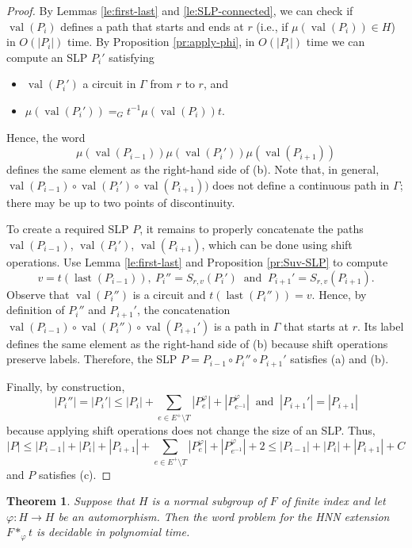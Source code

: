 \documentclass[12pt,oneside]{amsart}
\newtheorem{theorem}{Theorem}[section]
\theoremstyle{definition}
\theoremstyle{case}
\DeclareMathOperator{\last}{{last}}
\DeclareMathOperator{\val}{val}
\begin{document}
\begin{proof}
By Lemmas \ref{le:first-last} and \ref{le:SLP-connected},
we can check if $\val(P_i)$ defines a path that
starts and ends at $r$ (i.e., if $\mu(\val(P_i)) \in H$)
in $O(|P_i|)$ time.
By Proposition \ref{pr:apply-phi}, 
in $O(|P_i|)$ time we can compute an SLP $P_i'$ satisfying
\begin{itemize}
\item 
$\val(P_i')$ a circuit in $\Gamma$ from $r$ to $r$, and
\item 
$\mu(\val(P_i')) =_G t^{-1} \mu(\val(P_i)) t$.
\end{itemize}
Hence, the word
$$
\mu(\val(P_{i-1}))\mu(\val(P_{i}'))\mu(\val(P_{i+1}))
$$
defines the same element as the right-hand side of (b).
Note that, in general,
$\val(P_{i-1}) \circ \val(P_{i}') \circ \val(P_{i+1}))$
does not define a continuous path in $\Gamma$; 
there may be up to two points of discontinuity.

To create a required SLP $P$, it remains to 
properly concatenate the paths
$\val(P_{i-1})$, $\val(P_{i}')$, $\val(P_{i+1})$,
which can be done using shift operations.
Use Lemma \ref{le:first-last} and Proposition \ref{pr:Suv-SLP}
to compute 
$$
v = t(\last(P_{i-1})),
\ P_i''=S_{r,v}(P_i')
\ \mbox{ and }\ 
P_{i+1}'=S_{r,v}(P_{i+1}).
$$
Observe that $\val(P_i'')$ is a circuit and $t(\last(P_{i}'')) = v$.
Hence, by definition of $P_i''$ and $P_{i+1}'$,
the concatenation
$\val(P_{i-1}) \circ \val(P_i'') \circ \val(P_{i+1}')$
is a path in $\Gamma$ that starts at $r$.
Its label defines the same element as the right-hand side of (b)
because shift operations preserve labels.
Therefore, the SLP $P = P_{i-1} \circ P_i''\circ P_{i+1}'$
satisfies (a) and (b).

Finally, by construction,
$$
|P_i''| = |P_i'| \le |P_i| + \sum_{e\in E^+\setminus T}
|P_e^\varphi|+
|P_{e^{-1}}^\varphi|
\ \mbox{ and }\ 
|P_{i+1}'| = |P_{i+1}|
$$
because applying shift operations does not change the size of an SLP.
Thus, 
$$
|P| \le 
|P_{i-1}|+|P_{i}| + |P_{i+1}|+
\sum_{e\in E^+\setminus T}
|P_e^\varphi|+
|P_{e^{-1}}^\varphi| +2
\le |P_{i-1}| + |P_{i}| + |P_{i+1}| + C
$$
and $P$ satisfies (c).
\end{proof}


\begin{theorem}\label{th:main-case1}
Suppose that $H$ is a normal subgroup of $F$ of finite index
and let $\varphi:H\to H$ be an automorphism.
Then the word problem for the HNN extension $F\ast_\varphi t$
is decidable in polynomial time.
\end{theorem}
    
\end{document}
